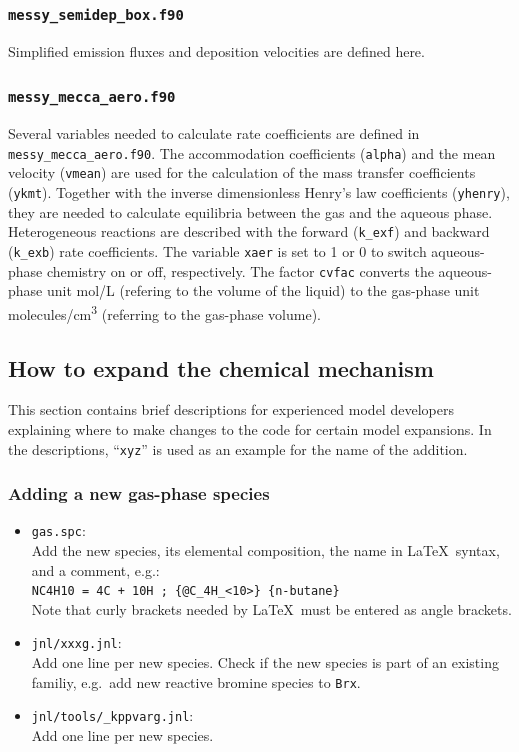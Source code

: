 \documentclass[twoside]{article}
\def\nosep{\setlength\parsep{0mm}\setlength\topsep{0mm}\setlength\itemsep{0mm}}
\begin{document}
\subsubsection{{\tt messy\_semidep\_box.f90}}

Simplified emission fluxes and deposition velocities are defined here.

\subsubsection{{\tt messy\_mecca\_aero.f90}}

Several variables needed to calculate rate coefficients are defined in
\verb|messy_mecca_aero.f90|. The accommodation coefficients
(\verb|alpha|) and the mean velocity (\verb|vmean|) are used for the
calculation of the mass transfer coefficients (\verb|ykmt|). Together
with the inverse dimensionless Henry's law coefficients (\verb|yhenry|),
they are needed to calculate equilibria between the gas and the aqueous
phase. Heterogeneous reactions are described with the forward
(\verb|k_exf|) and backward (\verb|k_exb|) rate coefficients. The
variable \verb|xaer| is set to 1 or 0 to switch aqueous-phase chemistry
on or off, respectively. The factor \verb|cvfac| converts the
aqueous-phase unit \unit{mol/L} (refering to the volume of the liquid)
to the gas-phase unit \unit{molecules/cm^3} (referring to the gas-phase
volume).

\subsection{How to expand the chemical mechanism}

This section contains brief descriptions for experienced model
developers explaining where to make changes to the code for certain
model expansions. In the descriptions, ``\verb|xyz|'' is used as an
example for the name of the addition.

\subsubsection{Adding a new gas-phase species}

\begin{itemize}\nosep
\item \verb|gas.spc|:\\
  Add the new species, its elemental composition,
  the name in La\TeX\ syntax, and a comment, e.g.:\\
  \verb|NC4H10 = 4C + 10H ; {@C_4H_<10>} {n-butane}|\\
  Note that curly brackets needed by La\TeX\ must be entered as angle
  brackets.
\item \verb|jnl/xxxg.jnl|:\\
  Add one line per new species. Check if the new species is part of an
  existing familiy, e.g.\ add new reactive bromine species to
  \verb|Brx|.
\item \verb|jnl/tools/_kppvarg.jnl|:\\
  Add one line per new species.
\end{itemize}
\end{document}
